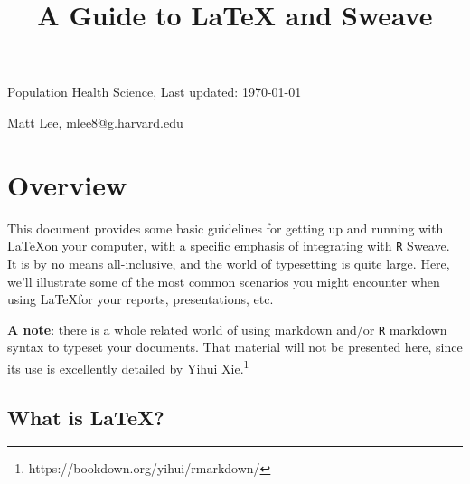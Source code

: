 \documentclass[11pt]{article}\usepackage[]{graphicx}\usepackage[]{color}
\title{\vspace{2cm} \textbf{A Guide to} \LaTeX \textbf{ and Sweave}}
\author{}
\date{\vspace{-2cm}}
\begin{document}
\maketitle

\begin{center}
\Large Population Health Science, Last updated: \today

\large Matt Lee, mlee8@g.harvard.edu
\end{center}

\vspace{6em}





\tableofcontents

\pagebreak

\section{Overview}

This document provides some basic guidelines for getting up and running with \LaTeX on your computer, with a specific emphasis of integrating with \texttt{R} Sweave. It is by no means all-inclusive, and the world of typesetting is quite large. Here, we'll illustrate some of the most common scenarios you might encounter when using \LaTeX for your reports, presentations, etc. 

\textbf{A note}: there is a whole related world of using markdown and/or \texttt{R} markdown syntax to typeset your documents. That material will not be presented here, since its use is excellently detailed by Yihui Xie.\footnote{https://bookdown.org/yihui/rmarkdown/}

\subsection{What is \LaTeX?}
\end{document}
